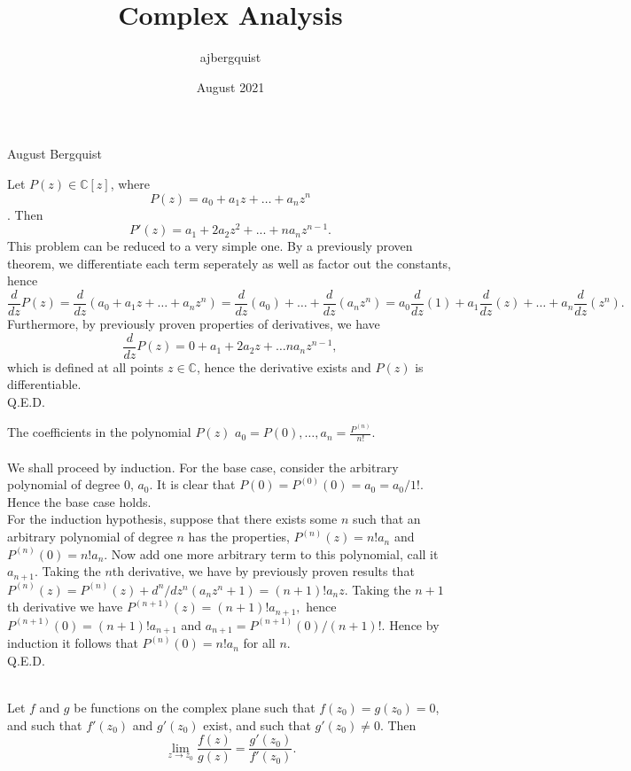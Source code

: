 \documentclass{article}
\title{Complex Analysis}
\author{ajbergquist }
\date{August 2021}
\theoremstyle{definition}
\newcommand{\deriv}{\frac{d}{dz}}
\newcommand{\C}{\mathbb{C}}
\newcommand{\cs}[1]{\color{blue}{#1}\normalcolor}
\begin{document}
  
\hfill August Bergquist

 Let $P(z) \in \C[z]$, where 
$$P(z) = a_0 + a_1 z + \dots + a_n z^n$$. Then 
$$P'(z) = a_1 + 2a_2z^2 + ... + na_nz^{n-1}.$$
 This problem can be reduced to a very simple one. By a previously proven theorem, we differentiate each term seperately as well as factor out the constants, hence 
$$ \deriv P(z) = \deriv(a_0 + a_1 z + \dots + a_n z^n) = 
\deriv(a_0) + \dots + \deriv(a_nz^n) = a_0\deriv(1)+a_1\deriv(z) + \dots + a_n\deriv(z^n).$$
Furthermore, by previously proven properties of derivatives, we have 
$$\deriv P(z) = 0 + a_1 + 2a_2z + \dots na_nz^{n-1},$$ which is defined at all points $z\in \C$, hence the derivative exists and $P(z)$ is differentiable.\\
Q.E.D.\\

\cs{Could be induction. 5/5}

 The coefficients in the polynomial $P(z)$ $a_0 = P(0), \dots, a_n = \frac{P^{(n)}}{n!}$.\\

 \\We shall proceed by induction. For the base case, consider the arbitrary polynomial of degree 0, $a_0$. It is clear that $P(0) = P^{(0)}(0)= a_0 = a_0/1!$. Hence the base case holds. \\
For the induction hypothesis, suppose that there exists some $n$ such that an arbitrary polynomial of degree $n$ has the properties, $P^{(n)}(z)= n!a_n$ and $P^{(n)}(0) = n!a_n$. Now add one more arbitrary term to this polynomial, call it $a_{n+1}$. Taking the $n$th derivative, we have by previously proven results that $P^(n)(z)= P^(n)(z) + d^n/dz^n(a_n z^n+1) = (n+1)!a_nz.$ Taking the $n+1$th derivative we have 
$P^{(n+1)}(z) = (n+1)!a_{n+1},$ hence $P^{(n+1)}(0) = (n+1)!a_{n+1}$ and $a_{n+1} = P^{(n+1)}(0)/(n+1)!$. Hence by induction it follows that $P^{(n)}(0) = n!a_n$ for all $n$.\\ Q.E.D.

\cs{5/5}

\\
 Let $f$ and $g$ be functions on the complex plane such that $f(z_0) = g(z_0) = 0$, and such that $f'(z_0)$ and $g'(z_0)$ exist, and such that $g'(z_0) \ne 0$. Then 
$$\lim_{z\to z_0}\frac{f(z)}{g(z)} = \frac{g'(z_0)}{f'(z_0)}.$$\\
\end{document}
